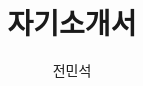 \documentclass[11pt]{article}
\begin{document}
\title{자기소개서}

\author{전민석}



\newcommand{\DisjunctiveModel}{\textsc{Disjunctive Model}}
\newcommand{\FeatureLanguage}{\textsc{Feature Language}}
\newcommand{\GDL}{\textsc{Graph Description Language}}
\newcommand{\PLXGL}{\textsc{PL4XGL}}





\newcommand{\AbstractRelativeWritePattern}{\textsc{Abstract Relative Write Pattern}}


%


\maketitle 
\end{document}
